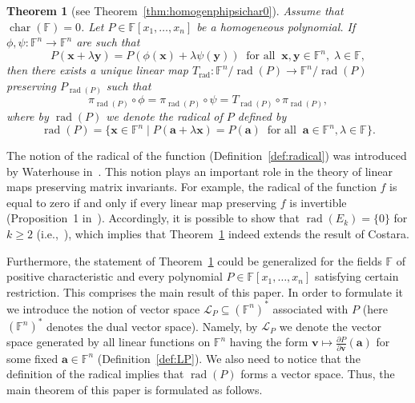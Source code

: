 \documentclass{elsarticle}
\DeclareMathOperator{\Char}{char}
\DeclareMathOperator{\rad}{rad}
\def\F{{\mathbb F}}
\newtheorem{theorem}{Theorem}[section]
\theoremstyle{definition}
\numberwithin{equation}{section}
\begin{document}
\begin{theorem}[see Theorem~\ref{thm:homogenphipsichar0}]\label{thm:homogenphipsiintrochar0}Assume that $\Char(\F) = 0$. Let $P \in \F[x_1,\ldots, x_n]$ be a homogeneous polynomial.  If  $\phi, \psi \colon \F^n \to \F^n$ are such that
\begin{equation*}%
P(\mathbf{x} + \lambda \mathbf{y}) = P(\phi(\mathbf{x}) + \lambda \psi(\mathbf{y}))\;\;\mbox{for all}\;\;\mathbf{x},\mathbf{y} \in \mathbb \F^n,\; \lambda \in \F,
\end{equation*}
then there exists a unique linear map $T_{\rad} \colon \F^n/\rad(P) \to \F^n/\rad(P)$ preserving $P_{\rad(P)}$ such that
\begin{equation*}%
\pi_{\rad(P)} \circ \phi = \pi_{\rad(P)} \circ \psi = T_{\rad(P)} \circ \pi_{\rad(P)},
\end{equation*}
where by $\rad(P)$ we denote the radical of $P$ defined by $$\rad(P) = \{\mathbf x \in \F^n \mid P(\mathbf a + \lambda \mathbf x) = P(\mathbf a)\;\;\mbox{for all}\;\; \mathbf a \in \F^n, \lambda \in \F\}.$$
\end{theorem} 
The notion of the radical of the function (Definition~\ref{def:radical}) was introduced by Waterhouse in~\cite{Waterhouse1983}. This notion plays an important role in the theory of linear maps preserving matrix invariants. For example, the radical of the function $f$ is equal to zero if and only if every linear map preserving $f$ is invertible (Proposition~1 in~\cite{Waterhouse1983}).  %
Accordingly, it is possible to show that $\rad(E_k) = \{0\}$ for $k \ge 2$ (i.e.,~\cite[Corollary~3.2]{Costara2021}), which implies that Theorem~\ref{thm:homogenphipsiintrochar0} indeed extends the result of Costara. 

Furthermore, the statement of Theorem~\ref{thm:homogenphipsiintrochar0} could be generalized for the fields $\F$ of positive characteristic and every polynomial $P \in \F[x_1,\ldots, x_n]$ satisfying certain restriction. This comprises the main result of this paper. In order to formulate it we introduce the notion of vector space $\mathcal L_P \subseteq \left(\F^n\right)^*$ associated with $P$ (here $\left(\F^n\right)^*$ denotes the dual vector space). Namely, by $\mathcal L_P$ we denote the vector space generated by all linear functions on $\F^n$ having the form $\mathbf v \mapsto \frac{\partial P}{\partial \mathbf v}(\mathbf a)$ for some fixed $\mathbf a \in \F^n$ (Definition~\ref{def:LP}). We also need to notice that the definition of the radical implies that $\rad(P)$ forms a vector space. Thus, the main theorem of this paper is formulated as follows.
\end{document}
